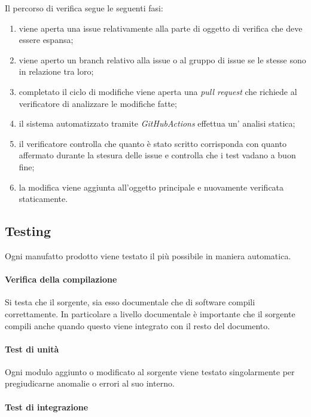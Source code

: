 Il percorso di verifica segue le seguenti fasi:

\begin{enumerate}
    \item viene aperta una issue relativamente alla parte di oggetto di verifica che deve essere espansa;
    \item viene aperto un branch relativo alla issue o al gruppo di issue se le stesse sono in relazione tra loro;
    \item completato il ciclo di modifiche viene aperta una \textit{pull request} che richiede al verificatore di analizzare le modifiche fatte;
    \item il sistema automatizzato tramite \textit{GitHubActions} effettua un' analisi statica;
    \item il verificatore controlla che quanto è stato scritto corrisponda con quanto affermato durante la stesura delle issue e controlla che i test vadano a buon fine;
    \item la modifica viene aggiunta all'oggetto principale e nuovamente verificata staticamente.
\end{enumerate}

\subsection{Testing}

Ogni manufatto prodotto viene testato il più possibile in maniera automatica.

\paragraph{Verifica della compilazione} Si testa che il sorgente, sia esso documentale che di software compili correttamente. In particolare a livello documentale è importante che il sorgente compili anche quando questo viene integrato con il resto del documento.

\paragraph{Test di unità}

Ogni modulo aggiunto o modificato al sorgente viene testato singolarmente per pregiudicarne anomalie o errori al suo interno.

\paragraph{Test di integrazione}

